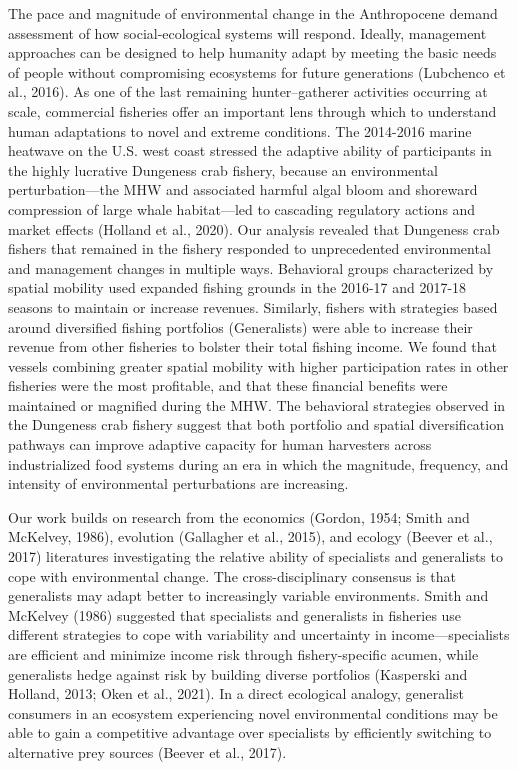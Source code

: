 \documentclass[]{elsarticle} %
\begin{document}
The pace and magnitude of environmental change in the Anthropocene
demand assessment of how social-ecological systems will respond.
Ideally, management approaches can be designed to help humanity adapt by
meeting the basic needs of people without compromising ecosystems for
future generations (Lubchenco et al., 2016). As one of the last
remaining hunter--gatherer activities occurring at scale, commercial
fisheries offer an important lens through which to understand human
adaptations to novel and extreme conditions. The 2014-2016 marine
heatwave on the U.S. west coast stressed the adaptive ability of
participants in the highly lucrative Dungeness crab fishery, because an
environmental perturbation---the MHW and associated harmful algal bloom
and shoreward compression of large whale habitat---led to cascading
regulatory actions and market effects (Holland et al., 2020). Our
analysis revealed that Dungeness crab fishers that remained in the
fishery responded to unprecedented environmental and management changes
in multiple ways. Behavioral groups characterized by spatial mobility
used expanded fishing grounds in the 2016-17 and 2017-18 seasons to
maintain or increase revenues. Similarly, fishers with strategies based
around diversified fishing portfolios (Generalists) were able to
increase their revenue from other fisheries to bolster their total
fishing income. We found that vessels combining greater spatial mobility
with higher participation rates in other fisheries were the most
profitable, and that these financial benefits were maintained or
magnified during the MHW. The behavioral strategies observed in the
Dungeness crab fishery suggest that both portfolio and spatial
diversification pathways can improve adaptive capacity for human
harvesters across industrialized food systems during an era in which the
magnitude, frequency, and intensity of environmental perturbations are
increasing.

Our work builds on research from the economics (Gordon, 1954; Smith and
McKelvey, 1986), evolution (Gallagher et al., 2015), and ecology (Beever
et al., 2017) literatures investigating the relative ability of
specialists and generalists to cope with environmental change. The
cross-disciplinary consensus is that generalists may adapt better to
increasingly variable environments. Smith and McKelvey (1986) suggested
that specialists and generalists in fisheries use different strategies
to cope with variability and uncertainty in income---specialists are
efficient and minimize income risk through fishery-specific acumen,
while generalists hedge against risk by building diverse portfolios
(Kasperski and Holland, 2013; Oken et al., 2021). In a direct ecological
analogy, generalist consumers in an ecosystem experiencing novel
environmental conditions may be able to gain a competitive advantage
over specialists by efficiently switching to alternative prey sources
(Beever et al., 2017).
\end{document}
